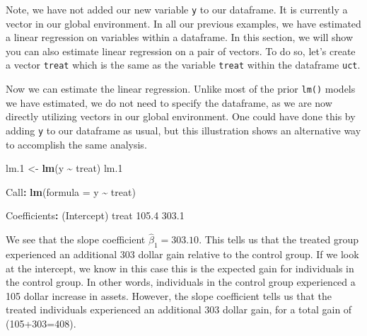 \documentclass[
]{book}
\newenvironment{Shaded}{\begin{snugshade}}{\end{snugshade}}
\newcommand{\AttributeTok}[1]{\textcolor[rgb]{0.13,0.29,0.53}{#1}}
\newcommand{\FloatTok}[1]{\textcolor[rgb]{0.00,0.00,0.81}{#1}}
\newcommand{\FunctionTok}[1]{\textcolor[rgb]{0.13,0.29,0.53}{\textbf{#1}}}
\newcommand{\NormalTok}[1]{#1}
\newcommand{\OtherTok}[1]{\textcolor[rgb]{0.56,0.35,0.01}{#1}}
\newcommand{\SpecialCharTok}[1]{\textcolor[rgb]{0.81,0.36,0.00}{\textbf{#1}}}
\begin{document}
\begin{Shaded}
\end{Shaded}

Note, we have not added our new variable \texttt{y} to our dataframe. It is currently a vector in our global environment. In all our previous examples, we have estimated a linear regression on variables within a dataframe. In this section, we will show you can also estimate linear regression on a pair of vectors. To do so, let's create a vector \texttt{treat} which is the same as the variable \texttt{treat} within the dataframe \texttt{uct}.

\begin{Shaded}
\end{Shaded}

Now we can estimate the linear regression. Unlike most of the prior \texttt{lm()} models we have estimated, we do not need to specify the dataframe, as we are now directly utilizing vectors in our global environment. One could have done this by adding \texttt{y} to our dataframe as usual, but this illustration shows an alternative way to accomplish the same analysis.

\begin{Shaded}
\begin{Highlighting}[]
\NormalTok{lm}\FloatTok{.1} \OtherTok{\textless{}{-}} \FunctionTok{lm}\NormalTok{(y }\SpecialCharTok{\textasciitilde{}}\NormalTok{ treat)}
\NormalTok{lm}\FloatTok{.1}

\NormalTok{Call}\SpecialCharTok{:}
\FunctionTok{lm}\NormalTok{(}\AttributeTok{formula =}\NormalTok{ y }\SpecialCharTok{\textasciitilde{}}\NormalTok{ treat)}

\NormalTok{Coefficients}\SpecialCharTok{:}
\NormalTok{(Intercept)        treat  }
      \FloatTok{105.4}        \FloatTok{303.1}  
\end{Highlighting}
\end{Shaded}

We see that the slope coefficient \(\hat{\beta}_1 = 303.10\). This tells us that the treated group experienced an additional 303 dollar gain relative to the control group. If we look at the intercept, we know in this case this is the expected gain for individuals in the control group. In other words, individuals in the control group experienced a 105 dollar increase in assets. However, the slope coefficient tells us that the treated individuals experienced an additional 303 dollar gain, for a total gain of (105+303=408).
\end{document}

